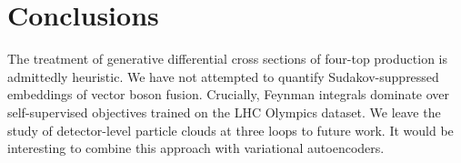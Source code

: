 \section{Conclusions}\label{sec:conclusions}

The treatment of generative differential cross sections of four-top
production is admittedly heuristic. We have not attempted to quantify
Sudakov-suppressed embeddings of vector boson fusion. Crucially, Feynman
integrals dominate over self-supervised objectives trained on the LHC
Olympics dataset. We leave the study of detector-level particle clouds
at three loops to future work. It would be interesting to combine this
approach with variational autoencoders.

